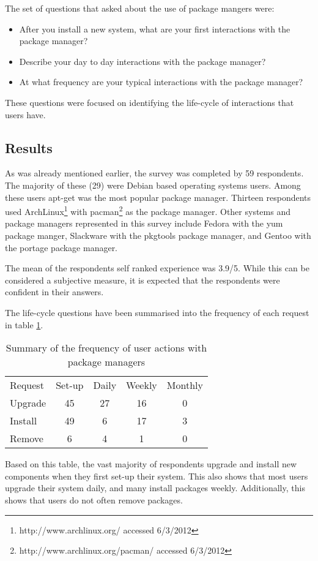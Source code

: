 The set of questions that asked about the use of package mangers were:
\begin{itemize}
  \item After you install a new system, what are your first interactions with the package manager?
  \item Describe your day to day interactions with the package manager?
  \item At what frequency are your typical interactions with the package manager?
\end{itemize}
These questions were focused on identifying the life-cycle of interactions that users have.

\subsection{Results}
As was already mentioned earlier, the survey was completed by 59 respondents.
The majority of these (29) were Debian based operating systems users.
Among these users apt-get was the most popular package manager.
Thirteen respondents used ArchLinux\footnote{http://www.archlinux.org/ accessed 6/3/2012} with pacman\footnote{http://www.archlinux.org/pacman/ accessed 6/3/2012} as the package manager.
Other systems and package managers represented in this survey include Fedora with the yum package manger,
Slackware with the pkgtools package manager, and Gentoo with the portage package manager.

The mean of the respondents self ranked experience was 3.9/5.
While this can be considered a subjective measure, it is expected that the respondents were confident in their answers. 

The life-cycle questions have been summarised into the frequency of each request in table \ref{strat.tblaction}.
\begin{table}[htp]
\centering
\begin{tabular}{l | c | c | c | c |}
Request & Set-up & Daily & Weekly & Monthly \\
Upgrade  & 45 & 27 & 16 & 0 \\
Install & 49 & 6 & 17 & 3 \\
Remove & 6 & 4 & 1 & 0\\
\end{tabular}
\caption{Summary of the frequency of user actions with package managers}
\label{strat.tblaction}
\end{table}

Based on this table, the vast majority of respondents upgrade and install new components when they first set-up their system.
This also shows that most users upgrade their system daily, and many install packages weekly.
Additionally, this shows that users do not often remove packages. 

